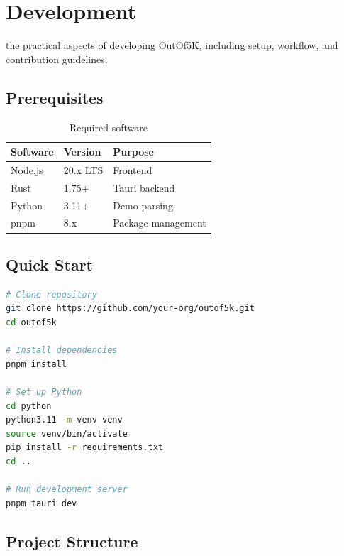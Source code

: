\chapter{Development}
\label{ch:development}

 the practical aspects of developing OutOf5K, including setup, workflow, and contribution guidelines.

\section{Prerequisites}

\begin{table}[h]
    \centering
    \begin{tabular}{@{}lll@{}}
        \toprule
        \textbf{Software} & \textbf{Version} & \textbf{Purpose} \\
        \midrule
        Node.js & 20.x LTS & Frontend \\
        Rust & 1.75+ & Tauri backend \\
        Python & 3.11+ & Demo parsing \\
        pnpm & 8.x & Package management \\
        \bottomrule
    \end{tabular}
    \caption{Required software}
\end{table}

\section{Quick Start}

\begin{lstlisting}[language=bash]
# Clone repository
git clone https://github.com/your-org/outof5k.git
cd outof5k

# Install dependencies
pnpm install

# Set up Python
cd python
python3.11 -m venv venv
source venv/bin/activate
pip install -r requirements.txt
cd ..

# Run development server
pnpm tauri dev
\end{lstlisting}

\section{Project Structure}



